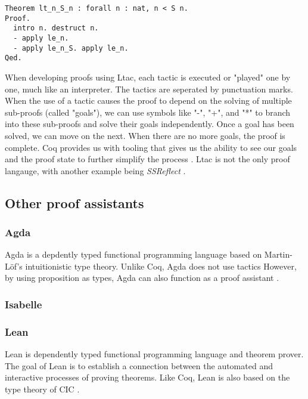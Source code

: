 \begin{minipage}{\linewidth}
\begin{lstlisting}[language=Coq, label={lst:ltac_ex}, caption={Example of Ltac syntax}]
Theorem lt_n_S_n : forall n : nat, n < S n.
Proof.
  intro n. destruct n.
  - apply le_n.
  - apply le_n_S. apply le_n.
Qed.
\end{lstlisting}
\end{minipage}

When developing proofs using Ltac, each tactic is executed or "played" one by one,
much like an interpreter. The tactics are seperated by punctuation marks.
When the use of a tactic causes the proof to depend on the solving of multiple sub-proofs (called "goals"),
we can use symbols like "-", "+", and "*" to branch into these sub-proofs and solve their goals independently.
Once a goal has been solved, we can move on the next. When there are no more goals, the proof is complete.
Coq provides us with tooling that gives us the ability to see our goals and the proof state
to further simplify the process \cite{cide}.
Ltac is not the only proof langauge, with another example being \textit{SSReflect} \cite{cssr}.

\subsection{Other proof assistants}
\label{ssec:other_proof_assistants}

\subsubsection{Agda}
\label{sssec:agda}

Agda is a depdently typed functional programming language based on Martin-Löf's
intuitionistic type theory. Unlike Coq, Agda does not use tactics
However, by using proposition as types, Agda can also function as a proof assistant
\cite{agdatut}.

\subsubsection{Isabelle}
\label{sssec:isabelle}

\subsubsection{Lean}
\label{sssec:lean}

Lean is dependently typed functional programming language and theorem prover.
The goal of Lean is to establish a connection between the automated and interactive processes of proving theorems.
Like Coq, Lean is also based on the type theory of CIC
\cite{lean}.


